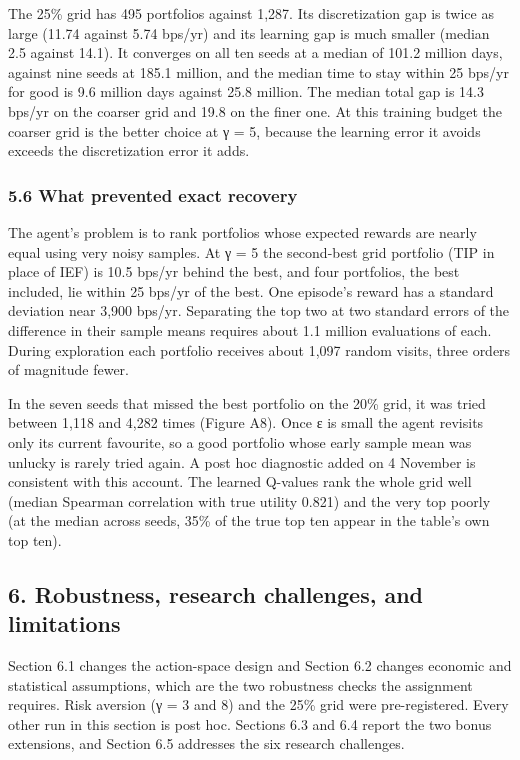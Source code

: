 \documentclass[
  11pt]{article}
\begin{document}
The 25\% grid has 495 portfolios against 1,287. Its discretization gap
is twice as large (11.74 against 5.74 bps/yr) and its learning gap is
much smaller (median 2.5 against 14.1). It converges on all ten seeds at
a median of 101.2 million days, against nine seeds at 185.1 million, and
the median time to stay within 25 bps/yr for good is 9.6 million days
against 25.8 million. The median total gap is 14.3 bps/yr on the coarser
grid and 19.8 on the finer one. At this training budget the coarser grid
is the better choice at γ = 5, because the learning error it avoids
exceeds the discretization error it adds.

\subsubsection{5.6 What prevented exact
recovery}\label{what-prevented-exact-recovery}

The agent's problem is to rank portfolios whose expected rewards are
nearly equal using very noisy samples. At γ = 5 the second-best grid
portfolio (TIP in place of IEF) is 10.5 bps/yr behind the best, and four
portfolios, the best included, lie within 25 bps/yr of the best. One
episode's reward has a standard deviation near 3,900 bps/yr. Separating
the top two at two standard errors of the difference in their sample
means requires about 1.1 million evaluations of each. During exploration
each portfolio receives about 1,097 random visits, three orders of
magnitude fewer.

In the seven seeds that missed the best portfolio on the 20\% grid, it
was tried between 1,118 and 4,282 times (Figure A8). Once ε is small the
agent revisits only its current favourite, so a good portfolio whose
early sample mean was unlucky is rarely tried again. A post hoc
diagnostic added on 4 November is consistent with this account. The
learned Q-values rank the whole grid well (median Spearman correlation
with true utility 0.821) and the very top poorly (at the median across
seeds, 35\% of the true top ten appear in the table's own top ten).

\subsection{6. Robustness, research challenges, and
limitations}\label{robustness-research-challenges-and-limitations}

Section 6.1 changes the action-space design and Section 6.2 changes
economic and statistical assumptions, which are the two robustness
checks the assignment requires. Risk aversion (γ = 3 and 8) and the 25\%
grid were pre-registered. Every other run in this section is post hoc.
Sections 6.3 and 6.4 report the two bonus extensions, and Section 6.5
addresses the six research challenges.
\end{document}
